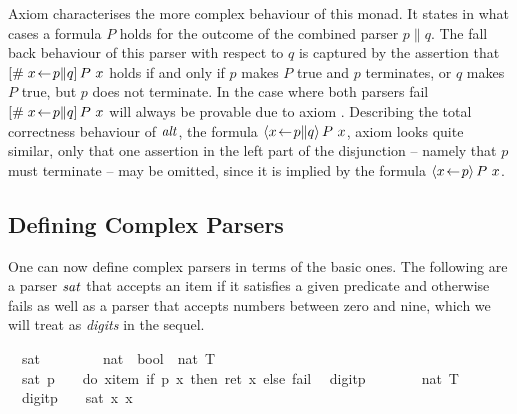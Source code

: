 Axiom  characterises the more complex behaviour of this monad. It
states in what cases a formula $P$ holds for the outcome of the combined parser
$p\|q$.  The fall back behaviour of this parser with respect to $q$ is captured
by the assertion that $[\#\;x\!\gets\! p\|q]\,{P\ x}$ holds if and only if $p$
makes $P$ true and $p$ terminates, or $q$ makes $P$ true, but $p$ does not
terminate. In the case where both parsers fail $[\#\;x\!\gets\! p\|q]\,{P\ x}$ will
always be provable due to axiom . Describing the total
correctness behaviour of $\mathit{alt}$, \IE the formula $\langle x\!\gets\! p\|q\rangle\,{P\
  x}$, axiom  looks quite similar, only that one assertion in
the left part of the disjunction -- namely that $p$ must terminate -- may be
omitted, since it is implied by the formula $\langle x\!\gets\! p\rangle\,{P\ x}$.

\subsection{Defining Complex Parsers}

One can now define complex parsers in terms of the basic ones. The following are
a parser $\mathit{sat}$ that accepts an item if it satisfies a given predicate and
otherwise fails as well as a parser that accepts numbers between zero and nine,
which we will treat as \emph{digits} in the sequel.
\begin{isabellebody}
\isanewline
{}\isanewline
\ \ sat\ \ \ \ \ \ \ \ {\isacharcolon}{\isacharcolon}\ {\isachardoublequote}{\isacharparenleft}nat\ {\isasymRightarrow}\ bool{\isacharparenright}\ {\isasymRightarrow}\ nat\ T{\isachardoublequote}\isanewline
\ \ {\isachardoublequote}sat\ p\ \ {\isasymequiv}\ \ do\ {\isacharbraceleft}x{\isasymleftarrow}item{\isacharsemicolon}\ if\ p\ x\ then\ ret\ x\ else\ fail{\isacharbraceright}{\isachardoublequote}\isanewline
\ \ digitp\ \ \ \ \ \ \ {\isacharcolon}{\isacharcolon}\ {\isachardoublequote}nat\ T{\isachardoublequote}\isanewline
\ \ {\isachardoublequote}digitp\ \ {\isasymequiv}\ \ sat\ {\isacharparenleft}{\isasymlambda}x{\isachardot}\ x\ {\isacharless}\ {}{}{\isacharparenright}{\isachardoublequote}\isamarkupfalse%
\isanewline
\end{isabellebody}

